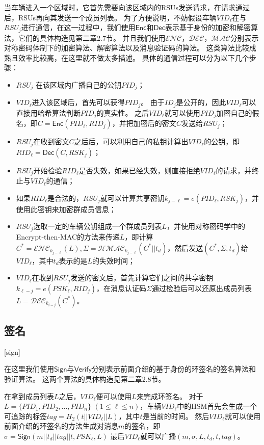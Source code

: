 当车辆进入一个区域时，它首先需要向该区域内的RSUs发送请求，在请求通过后，RSUs再向其发送一个成员列表。
为了方便说明，不妨假设车辆$VID_\ell$在与$RSU_j$进行通信，在这一过程中，我们使用$\mathsf{Enc}$和$\mathsf{Dec}$表示基于身份的加密和解密算法\cite{boneh2001identity}，它们的具体构造见第二章2.7节。
并且我们使用$\mathcal{ENC}$，$\mathcal{DEC}$，$\mathcal{MAC}$分别表示对称密码体制下的加密算法、解密算法以及消息验证码的算法。
这类算法比较成熟且效率比较高，在这里就不做太多描述。
具体的通信过程可以分为以下几个步骤：

\begin{itemize}
  \item $RSU_j$ 在该区域内广播自己的公钥$PID_j$；
  \item $VID_\ell$进入该区域后，首先可以获得$PID_j$。
  由于$ID_j$是公开的，因此$VID_\ell$可以直接用哈希算法判断$PID_j$的真实性。
  之后$VID_\ell$就可以使用$PID_j$加密自己的假名，即$C=\mathsf{Enc}(PID_\ell,RID_j)$，并把加密后的密文$C$发送给$RSU_j$；
  \item $RSU_j$在收到密文$C$之后后，可以利用自己的私钥计算出$VID_\ell$的公钥，即$RID_\ell=\mathsf{Dec}(C,RSK_j)$；
  \item $RSU_j$开始检验$RID_\ell$是否失效，如果已经失效，则直接拒绝$VID_\ell$的请求，并终止与$VID_\ell$的通信；
  \item 如果$RID_\ell$是合法的，$RSU_j$就可以计算共享密钥$k_{j-\ell}=e(PID_\ell,RSK_j)$，并使用此密钥来加密群成员信息；
  \item $RSU_j$选取一定的车辆公钥组成一个群成员列表$L$，并使用对称密码学中的Encrypt-then-MAC的方法来传递$L$，即计算$C^*=\mathcal{ENC}_{k_{j-\ell}}(L),\Sigma=\mathcal{HMAC}_{k_{j-\ell}}(C^*||t_d)$，然后发送$(C^*,\Sigma,t_d)$给$VID_\ell$，其中$t_d$表示的是$L$的失效时间；
  \item $VID_\ell$在收到$RSU_j$发送的密文后，首先计算它们之间的共享密钥$k_{\ell-j}=e(PSK_\ell,RID_j)$，在消息认证码$\Sigma$通过检验后可以还原出成员列表$L=\mathcal{DEC}_k_{i-j}(C^*)$。
\end{itemize}

\subsection{签名}[sign]

在这里我们使用$\mathsf{Sign}$与$\mathsf{Verify}$分别表示前面介绍的基于身份的环签名的签名算法和验证算法。
这两个算法的具体构造见第二章2.8节。

在拿到成员列表$L$之后，$VID_\ell$便可以使用$L$来完成环签名。
对于$L=\{PID_1,PID_2,...,PID_n\}$ $(1\leq \ell\leq n)$，车辆$VID_\ell$中的HSM首先会生成一个可追踪的标签$tag=H_2(t||VID_\ell||L)$，其中$t$是当前的时间。
然后$VID_\ell$就可以使用前面介绍的环签名的方法生成对消息$m$的签名，即$\sigma=\mathsf{Sign}(m||t_d||tag||t,PSK_\ell,L)$
最后$VID_\ell$就可以广播$(m,\sigma,L,t_d,t,tag)$。

